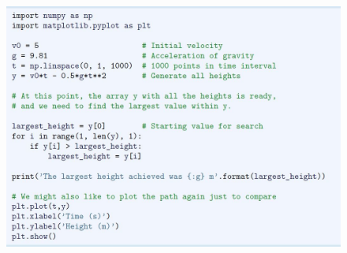 \documentclass[english,14pt]{beamer}
\begin{document}

\begin{frame}[fragile]

\frametitle{}

\begin{figure}[ht]
	\centering
	\includegraphics[width=\textwidth]{figures/LLp71a}
\end{figure}

\end{frame}

\end{document}
